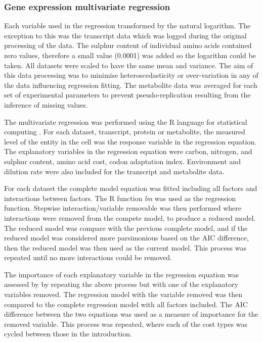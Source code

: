 \subsubsection{Gene expression multivariate regression}

Each variable used in the regression transformed by the natural logarithm. The exception to this was the transcript data which was logged during the original processing of the data. The sulphur content of individual amino acids contained zero values, therefore a small value (0.0001) was added so the logarithm could be taken. All datasets were scaled to have the same mean and variance. The aim of this data processing was to minimise heteroscedasticity or over-variation in any of the data influencing regression fitting. The metabolite data was averaged for each set of experimental parameters to prevent pseudo-replication resulting from the inference of missing values.

The multivariate regression was performed using the R language for statistical computing \cite{R}. For each dataset, transcript, protein or metabolite, the measured level of the entity in the cell was the response variable in the regression equation. The explanatory variables in the regression equation were carbon, nitrogen, and sulphur content, amino acid cost, codon adaptation index. Environment and dilution rate were also included for the transcript and metabolite data.

For each dataset the complete model equation was fitted including all factors and interactions between factors. The R function \emph{lm} was used as the regression function. Stepwise interaction/variable removable was then performed where interactions were removed from the compete model, to produce a reduced model. The reduced model was compare with the previous complete model, and if the reduced model was considered more parsimonious based on the AIC difference, then the reduced model was then used as the current model. This process was repeated until no more interactions could be removed.

The importance of each explanatory variable in the regression equation was assessed by by repeating the above process but with one of the explanatory variables removed. The regression model with the variable removed was then compared to the complete regression model with all factors included. The AIC difference between the two equations was used as a measure of importance for the removed variable. This process was repeated, where each of the cost types was cycled between those in the introduction.

